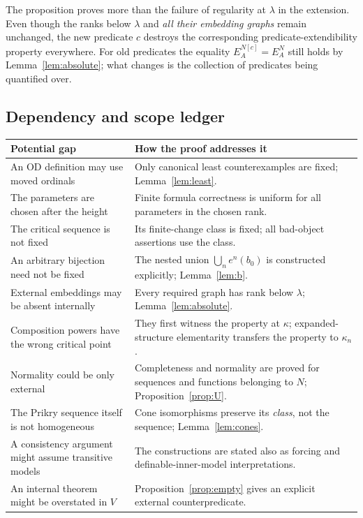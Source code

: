 \documentclass[11pt,letterpaper]{article}
\theoremstyle{definition}
\numberwithin{equation}{section}
\begin{document}
The proposition proves more than the failure of regularity at $\lambda$ in the extension. Even though the ranks below $\lambda$ and \emph{all their embedding graphs} remain unchanged, the new predicate $c$ destroys the corresponding predicate-extendibility property everywhere. For old predicates the equality $E_A^{N[c]}=E_A^N$ still holds by Lemma~\ref{lem:absolute}; what changes is the collection of predicates being quantified over.

\subsection{Dependency and scope ledger}

\begin{center}
\small
\renewcommand{\arraystretch}{1.2}
\begin{tabularx}{\textwidth}{@{}P{.29\textwidth}Y@{}}
\toprule
\textbf{Potential gap}&\textbf{How the proof addresses it}\\\midrule
An OD definition may use moved ordinals&Only canonical least counterexamples are fixed; Lemma~\ref{lem:least}.\\
The parameters are chosen after the height&Finite formula correctness is uniform for all parameters in the chosen rank.\\
The critical sequence is not fixed&Its finite-change class is fixed; all bad-object assertions use the class.\\
An arbitrary bijection need not be fixed&The nested union $\bigcup_n e^n(b_0)$ is constructed explicitly; Lemma~\ref{lem:b}.\\
External embeddings may be absent internally&Every required graph has rank below $\lambda$; Lemma~\ref{lem:absolute}.\\
Composition powers have the wrong critical point&They first witness the property at $\kappa$; expanded-structure elementarity transfers the property to $\kappa_n$.\\
Normality could be only external&Completeness and normality are proved for sequences and functions belonging to $N$; Proposition~\ref{prop:U}.\\
The Prikry sequence itself is not homogeneous&Cone isomorphisms preserve its \emph{class}, not the sequence; Lemma~\ref{lem:cones}.\\
A consistency argument might assume transitive models&The constructions are stated also as forcing and definable-inner-model interpretations.\\
An internal theorem might be overstated in $V$&Proposition~\ref{prop:empty} gives an explicit external counterpredicate.\\
\bottomrule
\end{tabularx}
\end{center}
\end{document}
